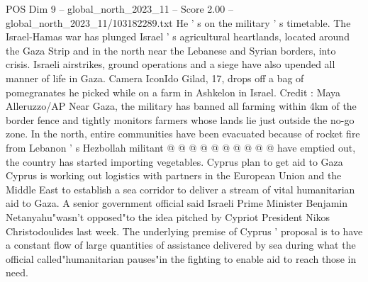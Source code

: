 \begin{textsample}{POS Dim 9 – global\_north\_2023\_11 – Score 2.00 – global\_north\_2023\_11/103182289.txt}
He ' s on the military ' s timetable.
The Israel-Hamas war has plunged Israel ' s agricultural heartlands, located around the Gaza Strip and in the north near the Lebanese and Syrian borders, into crisis.
Israeli airstrikes, ground operations and a siege have also upended all manner of life in Gaza.
Camera IconIdo Gilad, 17, drops off a bag of pomegranates he picked while on a farm in Ashkelon in Israel.
Credit : Maya Alleruzzo/AP Near Gaza, the military has banned all farming within 4km of the border fence and tightly monitors farmers whose lands lie just outside the no-go zone.
In the north, entire communities have been evacuated because of rocket fire from Lebanon ' s Hezbollah militant @ @ @ @ @ @ @ @ @ @ have emptied out, the country has started importing vegetables.
Cyprus plan to get aid to Gaza Cyprus is working out logistics with partners in the European Union and the Middle East to establish a sea corridor to deliver a stream of vital humanitarian aid to Gaza.
A senior government official said Israeli Prime Minister Benjamin Netanyahu"wasn't opposed"to the idea pitched by Cypriot President Nikos Christodoulides last week.
The underlying premise of Cyprus ' proposal is to have a constant flow of large quantities of assistance delivered by sea during what the official called"humanitarian pauses"in the fighting to enable aid to reach those in need.

\end{textsample}
